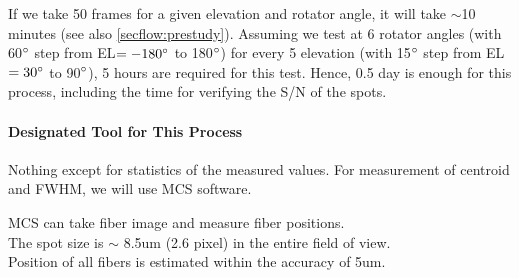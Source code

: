 If we take 50 frames for a given elevation and rotator angle, it will take $\sim$10 minutes (see also \ref{secflow:prestudy}).
Assuming we test at 6 rotator angles (with 60$^\circ$ step from EL$=-180^\circ$ to 180$^\circ$) for every 5 elevation (with 15$^\circ$ step from EL$=30^\circ$ to 90$^\circ$), 5 hours are required for this test.
Hence, 0.5 day is enough for this process, including the time for verifying the S/N of the spots.

\paragraph{Designated Tool for This Process}
Nothing except for statistics of the measured values.
For measurement of centroid and FWHM, we will use MCS software.


\begin{itembox}[l]{}
MCS can take fiber image and measure fiber positions. \\
The spot size is $\sim$ 8.5um (2.6 pixel) in the entire field of view. \\
Position of all fibers is estimated within the accuracy of 5um.

\end{itembox}